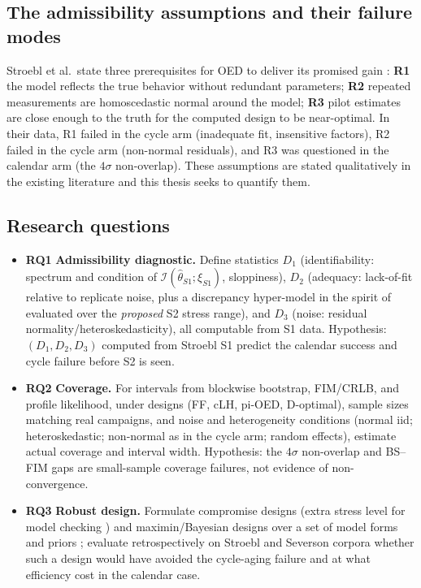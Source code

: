 \documentclass[11pt,letterpaper]{article}
\newcommand{\RQ}[1]{\textbf{RQ#1}}
\begin{document}
\subsection{The admissibility assumptions and their failure modes}
Stroebl et al.\ state three prerequisites for OED to deliver its promised gain \cite{stroebl2026}: \textbf{R1} the model reflects the true behavior without redundant parameters; \textbf{R2} repeated measurements are homoscedastic normal around the model; \textbf{R3} pilot estimates are close enough to the truth for the computed design to be near-optimal. In their data, R1 failed in the cycle arm (inadequate fit, insensitive factors), R2 failed in the cycle arm (non-normal residuals), and R3 was questioned in the calendar arm (the $4\sigma$ non-overlap). These assumptions are stated qualitatively in the existing literature and this thesis seeks to quantify them.

\subsection{Research questions}
\begin{itemize}
  \item \RQ{1} \textbf{Admissibility diagnostic.} Define statistics $D_1$ (identifiability: spectrum and condition of $\mathcal I(\hat\theta_{S1};\xi_{S1})$, sloppiness), $D_2$ (adequacy: lack-of-fit relative to replicate noise, plus a discrepancy hyper-model in the spirit of \cite{white2016} evaluated over the \emph{proposed} S2 stress range), and $D_3$ (noise: residual normality/heteroskedasticity), all computable from S1 data. Hypothesis: $(D_1,D_2,D_3)$ computed from Stroebl S1 predict the calendar success and cycle failure before S2 is seen.
  \item \RQ{2} \textbf{Coverage.} For intervals from blockwise bootstrap, FIM/CRLB, and profile likelihood, under designs (FF, cLH, pi-OED, D-optimal), sample sizes matching real campaigns, and noise and heterogeneity conditions (normal iid; heteroskedastic; non-normal as in the cycle arm; random effects), estimate actual coverage and interval width. Hypothesis: the $4\sigma$ non-overlap and BS--FIM gaps are small-sample coverage failures, not evidence of non-convergence.
  \item \RQ{3} \textbf{Robust design.} Formulate compromise designs (extra stress level for model checking \cite{limyum2011}) and maximin/Bayesian designs over a set of model forms and priors \cite{chaloner1995}; evaluate retrospectively on Stroebl and Severson corpora whether such a design would have avoided the cycle-aging failure and at what efficiency cost in the calendar case.
\end{itemize}
\end{document}
